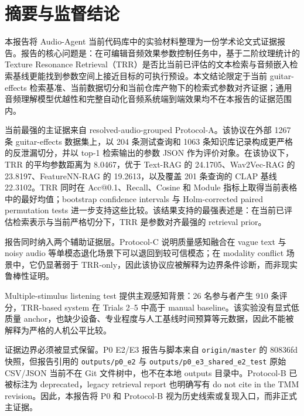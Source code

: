 \chapter{摘要与监督结论}

本报告将 Audio-Agent 当前代码库中的实验材料整理为一份学术论文式证据报告。报告的核心问题是：在可编辑音频效果参数控制任务中，基于二阶纹理统计的 Texture Resonance Retrieval（TRR）是否比当前已评估的文本检索与音频嵌入检索基线更能找到参数空间上接近目标的可执行预设。本文结论限定于当前 guitar-effects 检索基准、当前数据切分和当前仓库产物下的检索式参数对齐证据；通用音频理解模型优越性和完整自动化音频系统端到端效果均不在本报告的证据范围内。



当前最强的主证据来自 resolved-audio-grouped Protocol-A。该协议在外部 1267 条 guitar-effects 数据集上，以 204 条测试查询和 1063 条知识库记录构成更严格的反泄漏切分，并以 top-1 检索输出的参数 JSON 作为评价对象。在该协议下，TRR 的平均参数距离为 8.0467，优于 Text-RAG 的 24.1705、Wav2Vec-RAG 的 23.8197、FeatureNN-RAG 的 19.2613，以及覆盖 201 条查询的 CLAP 基线 22.3102。TRR 同时在 Acc@0.1、Recall、Cosine 和 Module 指标上取得当前表格中的最好均值；bootstrap confidence intervals 与 Holm-corrected paired permutation tests 进一步支持这些比较。该结果支持的最强表述是：在当前已评估检索表示与当前严格切分下，TRR 是参数对齐最强的 retrieval prior。

报告同时纳入两个辅助证据层。Protocol-C 说明质量感知融合在 vague text 与 noisy audio 等单模态退化场景下可以退回到较可信模态；在 modality conflict 场景中，它仍显著弱于 TRR-only，因此该协议应被解释为边界条件诊断，而非现实鲁棒性证明。

Multiple-stimulus listening test 提供主观感知背景：26 名参与者产生 910 条评分，TRR-based system 在 Trials 2--5 中高于 manual baseline。该实验没有显式低质量 anchor，也缺少设备、专业程度与人工基线时间预算等元数据，因此不能被解释为严格的人机公平比较。

证据边界必须被显式保留。P0 E2/E3 报告与脚本来自 \texttt{origin/master} 的 80836fd 快照，但报告引用的 \texttt{outputs/p0\_e2} 与 \texttt{outputs/p0\_e3\_shared\_e2\_test} 原始 CSV/JSON 当前不在 Git 文件树中，也不在本地 outputs 目录中。Protocol-B 已被标注为 deprecated，legacy retrieval report 也明确写有 do not cite in the TMM revision。因此，本报告将 P0 和 Protocol-B 视为历史线索或复现入口，而非正式主证据。


